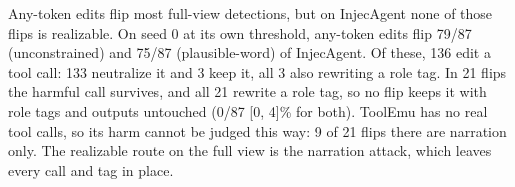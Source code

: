 \documentclass[letterpaper]{article} %
\begin{document}
Any-token edits flip most full-view detections, but on InjecAgent none of those flips is realizable. On seed 0 at its own threshold, any-token edits flip 79/87 (unconstrained) and 75/87 (plausible-word) of InjecAgent. Of these, 136 edit a tool call: 133 neutralize it and 3 keep it, all 3 also rewriting a role tag. In 21 flips the harmful call survives, and all 21 rewrite a role tag, so no flip keeps it with role tags and outputs untouched (0/87 [0, 4]\% for both). ToolEmu has no real tool calls, so its harm cannot be judged this way: 9 of 21 flips there are narration only. The realizable route on the full view is the narration attack, which leaves every call and tag in place.


\end{document}
